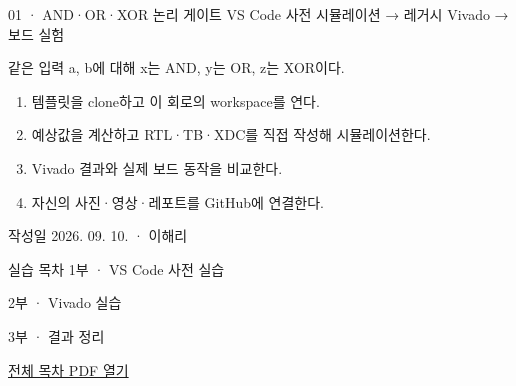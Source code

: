 
\renewcommand{\labonehome}{\hyperlink{legacy-01-contents}{\contentsbutton}}
\renewcommand{\legacySource}[1]{}
\providecommand{\terminalbox}[1]{\par\vspace{0.15cm}{\setlength{\fboxsep}{7pt}\colorbox{black}{\parbox{\dimexpr\textwidth-14pt\relax}{\color{white}\ttfamily\fontsize{7}{9}\selectfont #1}}}\par\vspace{0.15cm}}

\begingroup
\renewcommand{\small}{\fontsize{9}{11}\selectfont}
\begin{frame}{01 · AND·OR·XOR 논리 게이트}\relax
\small
VS Code 사전 시뮬레이션 → 레거시 Vivado → 보드 실험\par\vspace{0.22cm}같은 입력 a, b에 대해 x는 AND, y는 OR, z는 XOR이다.\par\begin{enumerate}\setlength{\itemsep}{0.22cm}
\item 템플릿을 clone하고 이 회로의 workspace를 연다.
\item 예상값을 계산하고 RTL·TB·XDC를 직접 작성해 시뮬레이션한다.
\item Vivado 결과와 실제 보드 동작을 비교한다.
\item 자신의 사진·영상·레포트를 GitHub에 연결한다.
\end{enumerate}
작성일 2026. 09. 10. · 이해리\par
\end{frame}

\begin{frame}[label=legacy-01-contents]{실습 목차}\relax
\small
1부 · VS Code 사전 실습\par{}\par\vspace{0.2cm}
\par\vspace{0.4cm}
2부 · Vivado 실습\par{}\par\vspace{0.4cm}
3부 · 결과 정리\par{}\par\vspace{0.35cm}
\href{04.LAB1_00_CONTENTS.pdf}{전체 목차 PDF 열기}
\end{frame}

